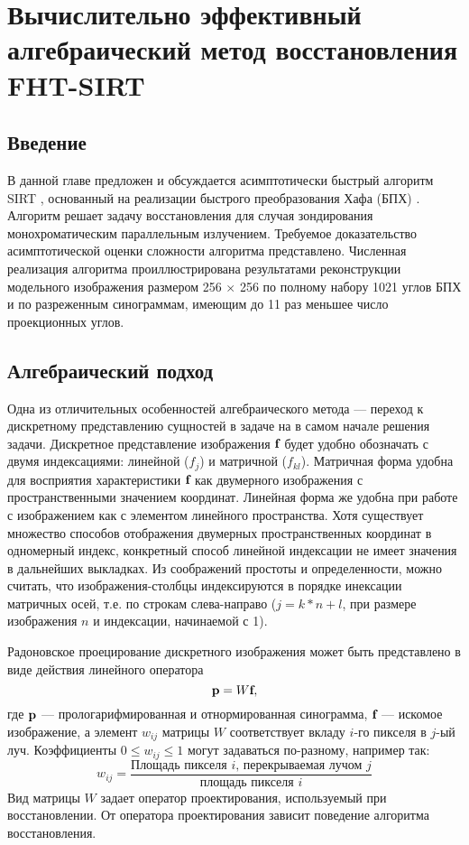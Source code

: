 \chapter{Вычислительно эффективный алгебраический метод восстановления FHT-SIRT} \label{chapt1}

\section{Введение}

В данной главе предложен и обсуждается асимптотически быстрый алгоритм SIRT \cite{GILBERTSIRT}, основанный на реализации быстрого преобразования Хафа (БПХ) \cite{hough}.
Алгоритм решает задачу восстановления для случая зондирования монохроматическим параллельным излучением.
Требуемое доказательство асимптотической оценки сложности алгоритма представлено.
Численная реализация алгоритма проиллюстрирована результатами реконструкции модельного изображения размером 256 $\times$ 256 по полному набору 1021 углов БПХ и по разреженным синограммам, имеющим до 11 раз меньшее число проекционных углов.

\section{Алгебраический подход}
Одна из отличительных особенностей алгебраического метода --- переход к дискретному представлению сущностей в задаче на в самом начале решения задачи. 
Дискретное представление изображения $\textbf f$ будет удобно обозначать с двумя индексациями: линейной ($f_j$) и матричной ($f_{kl}$). 
Матричная форма удобна для восприятия характеристики $\textbf f$ как двумерного изображения с пространственными значением координат.
Линейная форма же удобна при работе с изображением как с элементом линейного пространства.
Хотя существует множество способов отображения двумерных пространственных координат в одномерный индекс, конкретный способ линейной индексации не имеет значения в дальнейших выкладках.
Из соображений простоты и определенности, можно считать, что изображения-столбцы индексируются в порядке инексации матричных осей, т.е. по строкам слева-направо ($j = k * n + l$, при размере изображения $n$ и индексации, начинаемой с 1).

Радоновское проецирование дискретного изображения может быть представлено в виде действия линейного оператора
\begin{equation}\label{eq:linear_system}
\textbf p = W \textbf f,
\end{equation}
где $\textbf p$ --- прологарифмированная и отнормированная синограмма, $\textbf f$ --- искомое изображение, а элемент $w_{ij}$ матрицы $W$ соответствует вкладу $i$-го пикселя в $j$-ый луч.
Коэффициенты $0 \leq w_{ij} \leq 1$ могут задаваться по-разному, например так:
\begin{equation}
\label{eq:coeff}
w_{ij} = \frac{\text{Площадь пикселя $i$, перекрываемая лучом $j$}}{\text{площадь пикселя $i$}}
\end{equation}
Вид матрицы $W$ задает оператор проектирования, используемый при восстановлении.
От оператора проектирования зависит поведение алгоритма восстановления.

